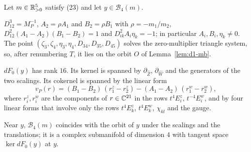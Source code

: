 \begin{lemma}\label{lem:d4-fibre}
Let $m\in\mathbb{R}_{>0}^5$ satisfy (23) and let $y\in\mathcal B_4(m)$.
\begin{alphalist}
  \item $D_{12}^3=M_P^{-1}$, $A_2=\rho A_1$ and $B_2=\rho B_1$ with $\rho=-m_1/m_2$,
  $D_{12}^2(A_1-A_2)(B_1-B_2)=1$ and $D_{ik}^2A_i\eta_k=-1$; in particular $A_i,B_i,\eta_k\ne0$.
  The point $(\zeta_3,\zeta_4,\eta_3,\eta_4,D_{34},D_{35},D_{45})$ solves the zero-multiplier
  triangle system, so, after renumbering $T$, it lies on the orbit $O$ of Lemma~\ref{lem:d1-mb}.
  \item $dF_0(y)$ has rank $16$.  Its kernel is spanned by $\partial_{\hat Z}$, $\partial_{\hat W}$
  and the generators of the two scalings.  Its cokernel is spanned by the linear form
  \[
    v_P(r)=(B_1-B_2)\,(r^z_1-r^z_2)-(A_1-A_2)\,(r^w_1-r^w_2),
  \]
  where $r^z_i,r^w_i$ are the components of $r\in\mathbb{C}^{21}$ in the rows $t^4E^z_i$, $t^{-4}E^w_i$, and
  by four linear forms that involve only the rows $t^4E^z_k$, $t^4E^w_k$, $\chi_{kl}$ and the gauge.
  \item Near $y$, $\mathcal B_4(m)$ coincides with the orbit of $y$ under the scalings and
  the translations; it is a complex submanifold of dimension $4$ with tangent space
  $\ker dF_0(y)$ at $y$.
\end{alphalist}
\end{lemma}

